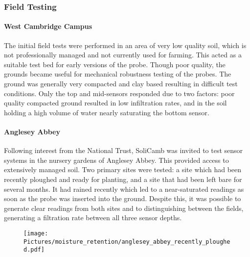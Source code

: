 \subsubsection{Field Testing} \label{sec:moistureprobe_field}

\paragraph{West Cambridge Campus}
The initial field tests were performed in an area of very low quality soil, which is not professionally managed and not currently used for farming. This acted as a suitable test bed for early versions of the probe. Though poor quality, the grounds became useful for mechanical robustness testing of the probes. The ground was generally very compacted and clay based resulting in difficult test conditions. Only the top and mid-sensors responded due to two factors: poor quality compacted ground resulted in low infiltration rates, and in the soil holding a high volume of water nearly saturating the bottom sensor.


\paragraph{Anglesey Abbey}
Following interest from the National Trust, SoliCamb was invited to test sensor systems in the nursery gardens of Anglesey Abbey. This provided access to extensively managed soil. Two primary sites were tested: a site which had been recently ploughed and ready for planting, and a site that had been left bare for several months. It had rained recently which led to a near-saturated readings as soon as the probe was inserted into the ground. Despite this, it was possible to generate clear readings from both sites and to distinguishing between the fields, generating a filtration rate between all three sensor depths.

\begin{figure}
	\centerline{\texttt{[image: Pictures/moisture\_retention/anglesey\_abbey\_recently\_ploughed.pdf]}}
	\captionsetup{justification = centering}
	\label{fangleseyabbeyrecentlyploughed}
\end{figure}

